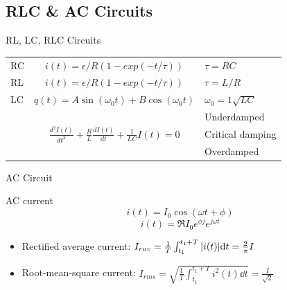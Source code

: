 \documentclass{beamer}
\begin{document}
\subsection{RLC \& AC Circuits}

\begin{frame}{RL, LC, RLC Circuits}
    \begin{table}[htbp]
        \centering
        \begin{tabular}{l c l}
            \toprule
            RC                   & $i(t)=\epsilon/R(1-exp(-t/\tau))$                                                                 & $\tau=RC$               \\ \addlinespace[1em]
            RL                   & $i(t)=\epsilon/R(1-exp(-t/\tau))$                                                                 & $\tau=L/R$              \\ \addlinespace[1em]
            LC                   & $q(t) = A\sin(\omega_0 t) + B\cos(\omega_0 t)$                                                    & $\omega_0 = 1\sqrt{LC}$ \\ \addlinespace[1em]
            \multirow{3}{*}{RLC} & \multirow{3}{*}{$\frac{d^{2} I(t)}{d t^{2}}+\frac{R}{L} \frac{d I(t)}{d t}+\frac{1}{L C} I(t)=0$} & Underdamped             \\
                                 &                                                                                                   & Critical damping        \\
                                 &                                                                                                   & Overdamped              \\
            \bottomrule
        \end{tabular}
    \end{table}
\end{frame}


\begin{frame}{AC Circuit}
    \begin{block}{AC current}
        \begin{equation}
            i(t) = I_0 \cos(\omega t + \phi)
        \end{equation}
        \begin{equation}
            i(t) = \Re{I_0 e^{\phi j} e^{j\omega t}}
        \end{equation}
    \end{block}
    \begin{itemize}
        \item Rectified average current: $I_{rav} = \frac{1}{T}\int_{t_1}^{t_1+T}\abs{i(t)}\dd t = \frac{2}{\pi}I$
        \item Root-mean-square current: $I_{rms} = \sqrt{\frac{1}{T}\int_{t_1}^{t_1+T}i^2(t)\dd t} = \frac{I}{\sqrt{2}}$
    \end{itemize}
\end{frame}
\end{document}
